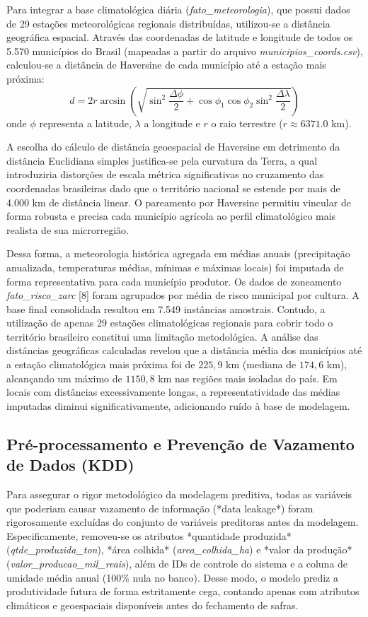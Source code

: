 \documentclass[conference]{IEEEtran}
\begin{document}
Para integrar a base climatológica diária (\textit{fato\_meteorologia}), que possui dados de 29 estações meteorológicas regionais distribuídas, utilizou-se a distância geográfica espacial. Através das coordenadas de latitude e longitude de todos os 5.570 municípios do Brasil (mapeadas a partir do arquivo \textit{municipios\_coords.csv}), calculou-se a distância de Haversine de cada município até a estação mais próxima:
\begin{equation}
d = 2r \arcsin \left( \sqrt{\sin^2\frac{\Delta \phi}{2} + \cos\phi_1 \cos\phi_2 \sin^2\frac{\Delta \lambda}{2}} \right)
\end{equation}
onde $\phi$ representa a latitude, $\lambda$ a longitude e $r$ o raio terrestre ($r \approx 6371.0$ km).

A escolha do cálculo de distância geoespacial de Haversine em detrimento da distância Euclidiana simples justifica-se pela curvatura da Terra, a qual introduziria distorções de escala métrica significativas no cruzamento das coordenadas brasileiras dado que o território nacional se estende por mais de 4.000 km de distância linear. O pareamento por Haversine permitiu vincular de forma robusta e precisa cada município agrícola ao perfil climatológico mais realista de sua microrregião.

Dessa forma, a meteorologia histórica agregada em médias anuais (precipitação anualizada, temperaturas médias, mínimas e máximas locais) foi imputada de forma representativa para cada município produtor. Os dados de zoneamento \textit{fato\_risco\_zarc} [8] foram agrupados por média de risco municipal por cultura. A base final consolidada resultou em 7.549 instâncias amostrais. Contudo, a utilização de apenas 29 estações climatológicas regionais para cobrir todo o território brasileiro constitui uma limitação metodológica. A análise das distâncias geográficas calculadas revelou que a distância média dos municípios até a estação climatológica mais próxima foi de $225{,}9$ km (mediana de $174{,}6$ km), alcançando um máximo de $1150{,}8$ km nas regiões mais isoladas do país. Em locais com distâncias excessivamente longas, a representatividade das médias imputadas diminui significativamente, adicionando ruído à base de modelagem.

\subsection{Pré-processamento e Prevenção de Vazamento de Dados (KDD)}
Para assegurar o rigor metodológico da modelagem preditiva, todas as variáveis que poderiam causar vazamento de informação (*data leakage*) foram rigorosamente excluídas do conjunto de variáveis preditoras antes da modelagem. Especificamente, removeu-se os atributos *quantidade produzida* (\textit{qtde\_produzida\_ton}), *área colhida* (\textit{area\_colhida\_ha}) e *valor da produção* (\textit{valor\_producao\_mil\_reais}), além de IDs de controle do sistema e a coluna de umidade média anual (100\% nula no banco). Desse modo, o modelo prediz a produtividade futura de forma estritamente cega, contando apenas com atributos climáticos e geoespaciais disponíveis antes do fechamento de safras.
\end{document}
